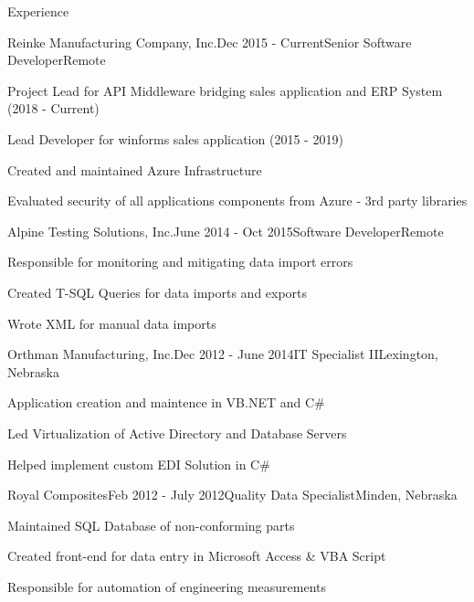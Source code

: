 \documentclass{resume} %
\begin{document}

\begin{rSection}{Experience}

\begin{rSubsection}{Reinke Manufacturing Company, Inc.}{Dec 2015 - Current}{Senior Software Developer}{Remote}
\item Project Lead for API Middleware bridging sales application and ERP System (2018 - Current)
\item Lead Developer for winforms sales application (2015 - 2019)
\item Created and maintained Azure Infrastructure
\item Evaluated security of all applications components from Azure - 3rd party libraries
\end{rSubsection}

\begin{rSubsection}{Alpine Testing Solutions, Inc.}{June 2014 - Oct 2015}{Software Developer}{Remote}
\item Responsible for monitoring and mitigating data import errors 
\item Created T-SQL Queries for data imports and exports
\item Wrote XML for manual data imports
\end{rSubsection}

\begin{rSubsection}{Orthman Manufacturing, Inc.}{Dec 2012 - June 2014}{IT Specialist II}{Lexington, Nebraska}
\item Application creation and maintence in VB.NET and C\#
\item Led Virtualization of Active Directory and Database Servers
\item Helped implement custom EDI Solution in C\#

\end{rSubsection}

\begin{rSubsection}{Royal Composites}{Feb 2012 - July 2012}{Quality Data Specialist}{Minden, Nebraska}
\item Maintained SQL Database of non-conforming parts
\item Created front-end for data entry in Microsoft Access \& VBA Script
\item Responsible for automation of engineering measurements
\end{rSubsection}


\end{rSection}
\end{document}
